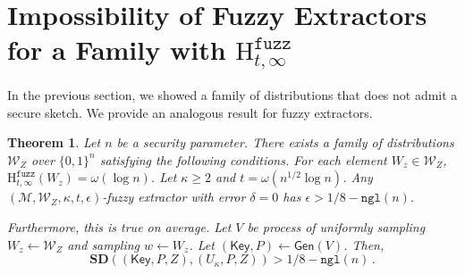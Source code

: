 \documentclass[11pt]{article}
\newcommand{\class}[1]{{\ensuremath{\mathsf{#1}}}}
\newcommand{\Key}{\ensuremath{\class{Key}}\xspace}
\newcommand{\gen}{\ensuremath{\class{Gen}}\xspace}
\newcommand{\zo}{\ensuremath{\{0, 1\}}}
\newcommand{\ngl}{\ensuremath{\mathtt{ngl}}\xspace}
\newcommand{\Hfuzz}{\mathrm{H}^{\mathtt{fuzz}}_{t,\infty}}
\newcommand{\sd}{\ensuremath{\mathbf{SD}}}
\newtheorem{theorem}{Theorem}[section]
\begin{document}
\section{Impossibility of Fuzzy Extractors for a Family with $\Hfuzz$}
\label{sec:imposs fuzz ext}
In the previous section, we showed a family of distributions that does not admit a secure sketch.  We provide an analogous result for fuzzy extractors.  

\begin{theorem}
\label{thm:imposs fuzz ext}
Let $n$ be a security parameter.  There exists a family of distributions $\mathcal{W}_Z$ over $\zo^n$ satisfying the following conditions. For each element $W_z\in \mathcal{W}_Z$, $\Hfuzz(W_z)= \omega(\log n)$. Let $\kappa \ge 2$ and $t = \omega(n^{1/2}\log n)$.  Any $(\mathcal{M}, \mathcal{W}_Z, \kappa, t, \epsilon)$-fuzzy extractor with error $\delta = 0$ has $\epsilon > 1/8 - \ngl(n)$.

Furthermore, this is true on average.  Let $V$ be process of uniformly sampling $W_z\leftarrow \mathcal{W}_Z$ and sampling $w\leftarrow W_z$.  Let $(\Key, P)\leftarrow \gen(V)$.  Then, 
\[
\sd ((\Key,P, Z), (U_\kappa, P, Z))>1/8-\ngl(n)\,.
\]

\end{theorem}
\end{document}
